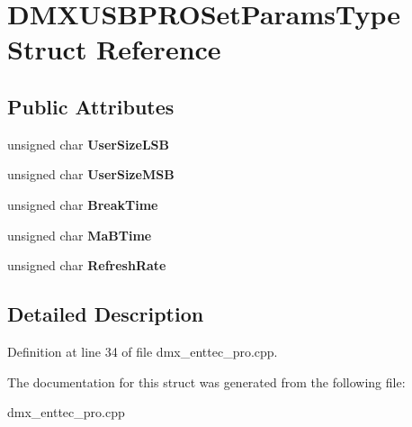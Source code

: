\hypertarget{structDMXUSBPROSetParamsType}{\section{D\-M\-X\-U\-S\-B\-P\-R\-O\-Set\-Params\-Type Struct Reference}
\label{structDMXUSBPROSetParamsType}
}
\subsection*{Public Attributes}
\begin{DoxyCompactItemize}
\item 
\hypertarget{structDMXUSBPROSetParamsType_a849e4ebeb6ebb38a6b2fc53c32d4456d}{unsigned char {\bfseries User\-Size\-L\-S\-B}}\label{structDMXUSBPROSetParamsType_a849e4ebeb6ebb38a6b2fc53c32d4456d}

\item 
\hypertarget{structDMXUSBPROSetParamsType_adae7671559ec6924d03fd27f50d6fda0}{unsigned char {\bfseries User\-Size\-M\-S\-B}}\label{structDMXUSBPROSetParamsType_adae7671559ec6924d03fd27f50d6fda0}

\item 
\hypertarget{structDMXUSBPROSetParamsType_ad5a0ccbc024303300f2933f16046abd4}{unsigned char {\bfseries Break\-Time}}\label{structDMXUSBPROSetParamsType_ad5a0ccbc024303300f2933f16046abd4}

\item 
\hypertarget{structDMXUSBPROSetParamsType_a766ed7ac1cd093a822fa905f43f81129}{unsigned char {\bfseries Ma\-B\-Time}}\label{structDMXUSBPROSetParamsType_a766ed7ac1cd093a822fa905f43f81129}

\item 
\hypertarget{structDMXUSBPROSetParamsType_a1e0b6924aa027f23f1bbd5606cbe09e7}{unsigned char {\bfseries Refresh\-Rate}}\label{structDMXUSBPROSetParamsType_a1e0b6924aa027f23f1bbd5606cbe09e7}

\end{DoxyCompactItemize}


\subsection{Detailed Description}


Definition at line 34 of file dmx\-\_\-enttec\-\_\-pro.\-cpp.



The documentation for this struct was generated from the following file\-:\begin{DoxyCompactItemize}
\item 
dmx\-\_\-enttec\-\_\-pro.\-cpp\end{DoxyCompactItemize}
